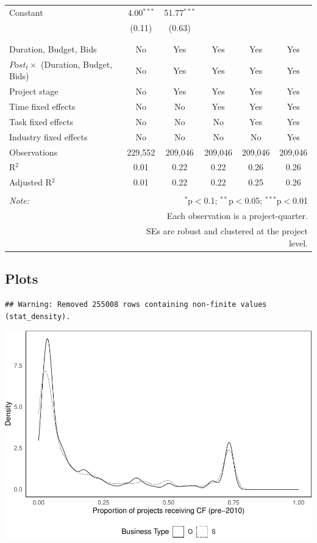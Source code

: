 \documentclass[
]{article}
\begin{document}
\begin{table}[H]
\begin{tabular}{@{\extracolsep{-2pt}}lccccc}
 Constant & 4.00$^{***}$ & 51.77$^{***}$ &  &  &  \\ 
  & (0.11) & (0.63) &  &  &  \\ 
  & & & & & \\ 
\hline \\[-1.8ex] 
Duration, Budget, Bids & No & Yes & Yes & Yes & Yes \\ 
$Post_t \times $  (Duration, Budget, Bids) & No & Yes & Yes & Yes & Yes \\ 
Project stage & No & Yes & Yes & Yes & Yes \\ 
Time fixed effects & No & No & Yes & Yes & Yes \\ 
Task fixed effects & No & No & No & Yes & Yes \\ 
Industry fixed effects & No & No & No & No & Yes \\ 
Observations & 229,552 & 209,046 & 209,046 & 209,046 & 209,046 \\ 
R$^{2}$ & 0.01 & 0.22 & 0.22 & 0.26 & 0.26 \\ 
Adjusted R$^{2}$ & 0.01 & 0.22 & 0.22 & 0.25 & 0.26 \\ 
\hline 
\hline \\[-1.8ex] 
\textit{Note:}  & \multicolumn{5}{r}{$^{*}$p$<$0.1; $^{**}$p$<$0.05; $^{***}$p$<$0.01} \\ 
 & \multicolumn{5}{r}{Each observation is a project-quarter.} \\ 
 & \multicolumn{5}{r}{SEs are robust and clustered at the project level.} \\ 
\end{tabular} 
\end{table}

\hypertarget{plots}{%
\subsection{Plots}\label{plots}}

\begin{verbatim}
## Warning: Removed 255008 rows containing non-finite values (stat_density).
\end{verbatim}

\includegraphics{qp_first_pc_delay-2_files/figure-latex/cf_plots-1.pdf}
\end{document}
